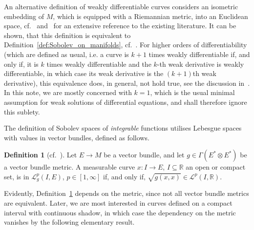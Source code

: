 \documentclass[preprint,12pt]{elsarticle}
\theoremstyle{definition}
\newtheorem{definition}[theorem]{Definition}
\begin{document}
An alternative definition of weakly differentiable curves considers an isometric embedding of $M$, which is equipped with a Riemannian metric, into an Euclidean space, cf.~\cite{Hajl09} and~\cite{ConvScha16} for an extensive reference to the existing literature. It can be shown, that this definition is equivalent to Definition~\ref{def:Sobolev_on_manifolds}, cf.~\cite[Proposition 2.7]{ConvScha16}. For higher orders of differentiability (which are defined as usual, i.e. a curve is $k+1$ times weakly differentiable if, and only if, it is $k$ times weakly differentiable and the $k$-th weak derivative is weakly differentiable, in which case its weak derivative is the $(k+1)$th weak derivative), this equivalence does, in general, not hold true, see the discussion in~\cite{ConvSchaf19}. In this note, we are mostly concerned with $k = 1$, which is the usual minimal assumption for weak solutions of differential equations, and shall therefore ignore this sublety.

The definition of Sobolev spaces of \textit{integrable} functions utilises Lebesgue spaces with values in vector bundles, defined as follows.

\begin{definition}[{cf.~\cite[\S 8]{Pala68}}] \label{def:nonlinear_integrability}
Let $E\to M$ be a vector bundle, and let $g\in\Gamma(E^*\otimes E^*)$ be a vector bundle metric. A measurable curve $x:I\to E$, $I\subseteq\mathbb{R}$ an open or compact set, is in $\mathcal{L}^p_g(I,E)$, $p\in [1,\infty]$ if, and only if, $\sqrt{g(x,x)}\in \mathcal{L}^p(I,\mathbb{R})$.
\end{definition}

Evidently, Definition~\ref{def:nonlinear_integrability} depends on the metric, since not all vector bundle metrics are equivalent. Later, we are most interested in curves defined on a compact interval with continuous shadow, in which case the dependency on the metric vanishes by the following elementary result.
\end{document}

